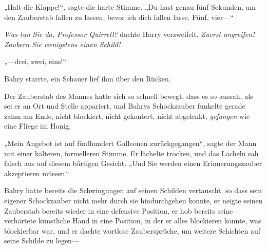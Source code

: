 „Halt die Klappe!“, sagte die harte Stimme. „Du hast genau fünf Sekunden, um den Zauberstab fallen zu lassen, bevor ich dich fallen lasse. Fünf, vier—“

\emph{Was tun Sie da, Professor Quirrell?} dachte Harry verzweifelt. \emph{Zuerst angreifen! Zaubern Sie wenigstens einen Schild!}

„—drei, zwei, eins!“ 

\later

Bahry starrte, ein Schauer lief ihm über den Rücken.

Der Zauberstab des Mannes hatte sich so schnell bewegt, dass es so aussah, als sei er an Ort und Stelle appariert, und Bahrys Schockzauber funkelte gerade zahm am Ende, nicht blockiert, nicht gekontert, nicht abgelenkt, \emph{gefangen} wie eine Fliege im Honig.

„Mein Angebot ist auf fünfhundert Galleonen zurückgegangen“, sagte der Mann mit einer kälteren, formelleren Stimme. Er lächelte trocken, und das Lächeln sah falsch aus auf diesem bärtigen Gesicht. „Und Sie werden einen Erinnerungszauber akzeptieren müssen.“

Bahry hatte bereits die Schwingungen auf seinen Schilden vertauscht, so dass sein eigener Schockzauber nicht mehr durch sie hindurchgehen konnte, er neigte seinen Zauberstab bereits wieder in eine defensive Position, er hob bereits seine verhärtete künstliche Hand in eine Position, in der er alles blockieren konnte, was blockierbar war, und er dachte wortlose Zaubersprüche, um weitere Schichten auf seine Schilde zu legen—

